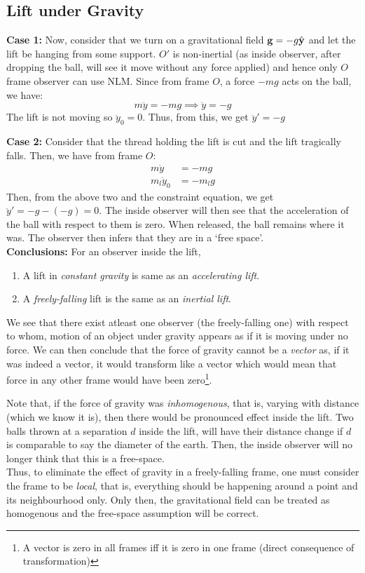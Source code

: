 \subsection{Lift under Gravity}
\textbf{Case 1:} Now, consider that we turn on a gravitational field $\vb{g} = -g \hat{\vb{y}}$ and let the lift be hanging from some support. $O'$ is non-inertial (as inside observer, after dropping the ball, will see it move without any force applied) and hence only $O$ frame observer can use NLM. Since from frame $O$, a force $-mg$ acts on the ball, we have:
$$m \ddot{y} = - mg \implies \ddot{y} = -g$$
The lift is not moving so $\ddot{y}_0 = 0$. Thus, from this, we get $\ddot{y}' = -g$
\begin{figure}[H]
    \centering
    
\end{figure}
\noindent
\textbf{Case 2:} Consider that the thread holding the lift is cut and the lift tragically falls. Then, we have from frame $O$:
\begin{align*}
    m\ddot{y} &= -mg\\
    m_l \ddot{y}_0 &= -m_l g
\end{align*}
Then, from the above two and the constraint equation,  we get $\ddot{y}' = -g - (-g) = 0$.
The inside observer will then see that the acceleration of the ball with respect to them is zero. When released, the ball remains where it was. The observer then infers that they are in a `free space'.\\[0.2cm]
\textbf{Conclusions:}
For an observer inside the lift,
\begin{enumerate}
    \item A lift in \textit{constant gravity} is same as an \textit{accelerating lift}.
    \item A \textit{freely-falling} lift is the same as an \textit{inertial lift}.
\end{enumerate}
We see that there exist atleast one observer (the freely-falling one) with respect to whom, motion of an object under gravity appears as if it is moving under no force. We can then conclude that the force of gravity cannot be a \textit{vector} as, if it was indeed a vector, it would transform like a vector which would mean that force in any other frame would have been zero\footnote{A vector is zero in all frames iff it is zero in one frame (direct consequence of transformation)}.
\begin{figure}[H]
    \centering 
    
\end{figure}
\noindent
Note that, if the force of gravity was \textit{inhomogenous}, that is, varying with distance (which we know it is), then there would be pronounced effect inside the lift. Two balls thrown at a separation $d$ inside the lift, will have their distance change if $d$ is comparable to say the diameter of the earth. Then, the inside observer will no longer think that this is a free-space. \\[0.2cm]
Thus, to eliminate the effect of gravity in a freely-falling frame, one must consider the frame to be \textit{local}, that is, everything should be happening around a point and its neighbourhood only. Only then, the gravitational field can be treated as homogenous and the free-space assumption will be correct. 